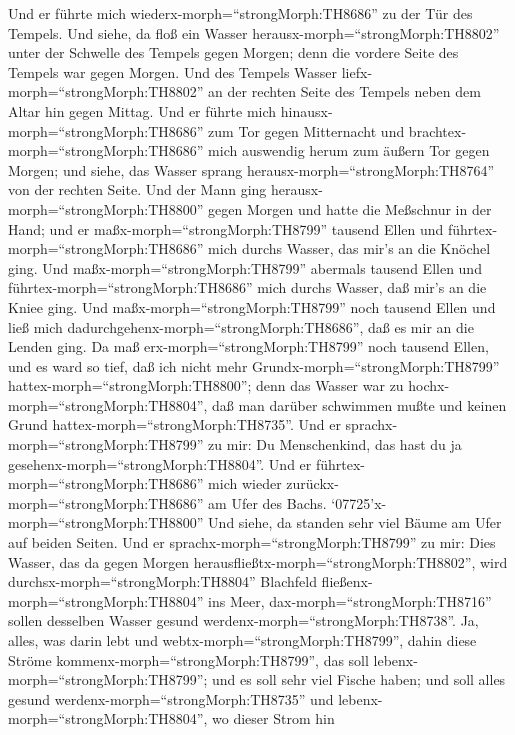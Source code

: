  Und er führte mich wiederx-morph=``strongMorph:TH8686'' zu
der Tür des Tempels. Und siehe, da floß ein Wasser
herausx-morph=``strongMorph:TH8802'' unter der Schwelle des Tempels
gegen Morgen; denn die vordere Seite des Tempels war gegen Morgen. Und
des Tempels Wasser liefx-morph=``strongMorph:TH8802'' an der rechten
Seite des Tempels neben dem Altar hin gegen Mittag.  Und er
führte mich hinausx-morph=``strongMorph:TH8686'' zum Tor gegen
Mitternacht und brachtex-morph=``strongMorph:TH8686'' mich auswendig
herum zum äußern Tor gegen Morgen; und siehe, das Wasser sprang
herausx-morph=``strongMorph:TH8764'' von der rechten Seite. 
Und der Mann ging herausx-morph=``strongMorph:TH8800'' gegen Morgen und
hatte die Meßschnur in der Hand; und er
maßx-morph=``strongMorph:TH8799'' tausend Ellen und
führtex-morph=``strongMorph:TH8686'' mich durchs Wasser, das mir's an
die Knöchel ging.  Und maßx-morph=``strongMorph:TH8799''
abermals tausend Ellen und führtex-morph=``strongMorph:TH8686'' mich
durchs Wasser, daß mir's an die Kniee ging. Und
maßx-morph=``strongMorph:TH8799'' noch tausend Ellen und ließ mich
dadurchgehenx-morph=``strongMorph:TH8686'', daß es mir an die Lenden
ging.  Da maß erx-morph=``strongMorph:TH8799'' noch tausend
Ellen, und es ward so tief, daß ich nicht mehr
Grundx-morph=``strongMorph:TH8799'' hattex-morph=``strongMorph:TH8800'';
denn das Wasser war zu hochx-morph=``strongMorph:TH8804'', daß man
darüber schwimmen mußte und keinen Grund
hattex-morph=``strongMorph:TH8735''.  Und er
sprachx-morph=``strongMorph:TH8799'' zu mir: Du Menschenkind, das hast
du ja gesehenx-morph=``strongMorph:TH8804''. Und er
führtex-morph=``strongMorph:TH8686'' mich wieder
zurückx-morph=``strongMorph:TH8686'' am Ufer des Bachs. 
`07725'\textbar x-morph=``strongMorph:TH8800'' Und siehe, da standen
sehr viel Bäume am Ufer auf beiden Seiten.  Und er
sprachx-morph=``strongMorph:TH8799'' zu mir: Dies Wasser, das da gegen
Morgen herausfließtx-morph=``strongMorph:TH8802'', wird
durchsx-morph=``strongMorph:TH8804'' Blachfeld
fließenx-morph=``strongMorph:TH8804'' ins Meer,
dax-morph=``strongMorph:TH8716'' sollen desselben Wasser gesund
werdenx-morph=``strongMorph:TH8738''.  Ja, alles, was darin
lebt und webtx-morph=``strongMorph:TH8799'', dahin diese Ströme
kommenx-morph=``strongMorph:TH8799'', das soll
lebenx-morph=``strongMorph:TH8799''; und es soll sehr viel Fische haben;
und soll alles gesund werdenx-morph=``strongMorph:TH8735'' und
lebenx-morph=``strongMorph:TH8804'', wo dieser Strom hin
